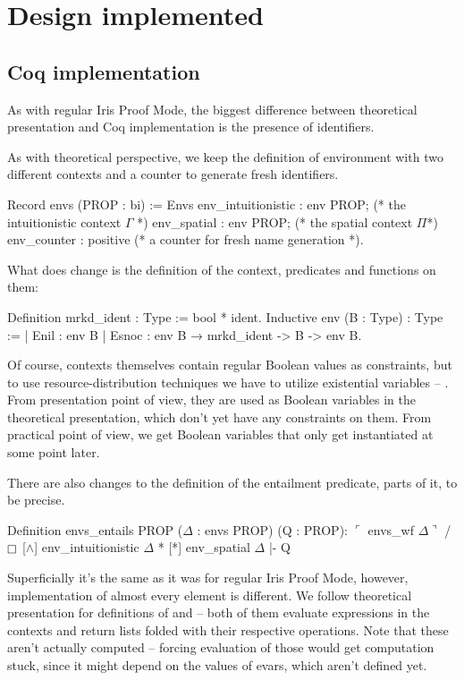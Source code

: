 \section{Design implemented}

\subsection{Coq implementation}
\label{subsec:ipm_constr_coq_implementation}

As with regular Iris Proof Mode, the biggest difference between theoretical presentation and Coq implementation is the presence of identifiers.

As with theoretical perspective, we keep the definition of environment with two different contexts and a counter to generate fresh identifiers.
\begin{coq}
  Record envs (PROP : bi) := Envs {
    env_intuitionistic : env PROP; (* the intuitionistic context \(\Gamma\) *)
    env_spatial : env PROP; (* the spatial context \(\Pi\)*)
    env_counter : positive (* a counter for fresh name generation *)}.
\end{coq}

What does change is the definition of the context, predicates and functions on them:
\begin{coq}
  Definition mrkd_ident : Type := bool * ident.
  Inductive env (B : Type) : Type :=
  | Enil : env B
  | Esnoc : env B → mrkd_ident -> B -> env B.
\end{coq}

Of course, contexts themselves contain regular Boolean values as constraints, but to use resource-distribution techniques we have to utilize existential variables -- \citet[Section 2.2.1]{thecoqdevelopmentteamCoqProofAssistant2020}.
From presentation point of view, they are used as Boolean variables in the theoretical presentation, which don't yet have any constraints on them.
From practical point of view, we get Boolean variables that only get instantiated at some point later.

There are also changes to the definition of the entailment predicate, parts of it, to be precise.
\begin{coq}
  Definition envs_entails {PROP} ($\Delta$ : envs PROP) (Q : PROP):
  $\ulcorner$ envs_wf $\Delta \urcorner$ /\ $\intuit$ [$\wedge$] env_intuitionistic $\Delta$ * [*] env_spatial $\Delta$ |- Q
\end{coq}

Superficially it's the same as it was for regular Iris Proof Mode, however, implementation of almost every element is different.
We follow theoretical presentation for definitions of \coqe{$\intuit$ [$\wedge$]} and \coqe{[*]} -- both of them evaluate expressions in the contexts and return lists folded with their respective operations.
Note that these aren't actually computed -- forcing evaluation of those would get computation stuck, since it might depend on the values of evars, which aren't defined yet.

